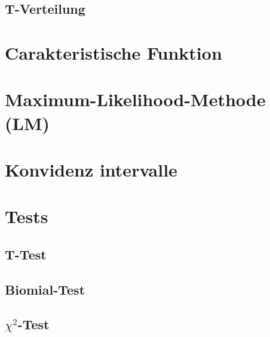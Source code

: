 \documentclass[a4paper, 11pt]{article}
\begin{document}
\subsection{T-Verteilung}
\section{Carakteristische Funktion}
\section{Maximum-Likelihood-Methode (LM)}
\section{Konvidenz intervalle}
\section{Tests}
\subsection{T-Test}
\subsection{Biomial-Test}
\subsection{$\chi^2$-Test}
\end{document}
